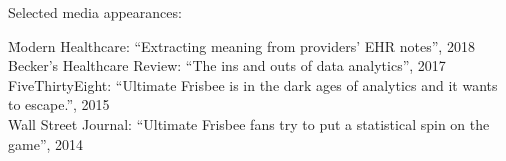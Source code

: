 Selected media appearances: \vspace*{-0.5em}
\begin{tabbing}
\hspace*{2em}\= Modern Healthcare: ``Extracting meaning from providers' EHR notes'', 2018\\
\> Becker's Healthcare Review: ``The ins and outs of data analytics'', 2017\\
\> FiveThirtyEight: ``Ultimate Frisbee is in the dark ages of analytics and it wants to escape.'', 2015\\
\> Wall Street Journal: ``Ultimate Frisbee fans try to put a statistical spin on the game'', 2014\\
\end{tabbing}


%
%
%
%
%
%
%
%


